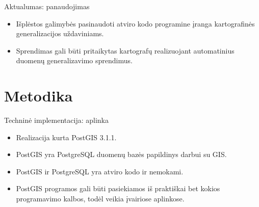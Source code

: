 \documentclass[14pt]{beamer}
\begin{document}
\begin{frame}{Aktualumas: panaudojimas}
    \begin{itemize}[<+->]
        \item Išplėstos galimybės pasinaudoti atviro
            kodo programine įranga kartografinės generalizacijos
            uždaviniams.
        \item Sprendimas gali būti pritaikytas kartografų realizuojant
            automatinius duomenų generalizavimo sprendimus.
    \end{itemize}
\end{frame}


\section{Metodika}

\begin{frame}{Techninė implementacija: aplinka}
    \begin{itemize}[<+->]
        \item Realizacija kurta PostGIS 3.1.1.

        \item PostGIS yra PostgreSQL duomenų bazės papildinys darbui su GIS.

        \item PostGIS ir PostgreSQL yra atviro kodo ir nemokami.
            
        \item PostGIS programos gali būti pasiekiamos iš praktiškai bet kokios
            programavimo kalbos, todėl veikia įvairiose aplinkose.

    \end{itemize}
\end{frame}
\end{document}
